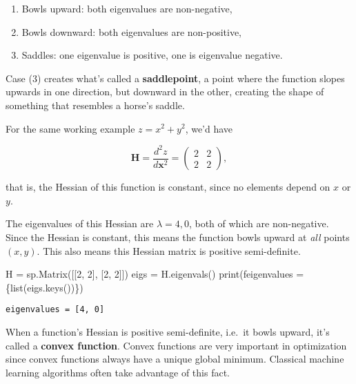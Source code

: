 \documentclass[
  letterpaper,
  DIV=11,
  numbers=noendperiod]{scrreprt}
\newenvironment{Shaded}{\begin{snugshade}}{\end{snugshade}}
\newcommand{\BuiltInTok}[1]{\textcolor[rgb]{0.00,0.23,0.31}{#1}}
\newcommand{\DecValTok}[1]{\textcolor[rgb]{0.68,0.00,0.00}{#1}}
\newcommand{\NormalTok}[1]{\textcolor[rgb]{0.00,0.23,0.31}{#1}}
\newcommand{\OperatorTok}[1]{\textcolor[rgb]{0.37,0.37,0.37}{#1}}
\newcommand{\SpecialCharTok}[1]{\textcolor[rgb]{0.37,0.37,0.37}{#1}}
\newcommand{\SpecialStringTok}[1]{\textcolor[rgb]{0.13,0.47,0.30}{#1}}
\providecommand{\tightlist}{%
  \setlength{\itemsep}{0pt}\setlength{\parskip}{0pt}}\usepackage{longtable,booktabs,array}
\begin{document}
\begin{enumerate}
\def\labelenumi{\arabic{enumi}.}
\tightlist
\item
  Bowls upward: both eigenvalues are non-negative,
\item
  Bowls downward: both eigenvalues are non-positive,
\item
  Saddles: one eigenvalue is positive, one is eigenvalue negative.
\end{enumerate}

Case (3) creates what's called a \textbf{saddlepoint}, a point where the
function slopes upwards in one direction, but downward in the other,
creating the shape of something that resembles a horse's saddle.

For the same working example \(z=x^2+y^2\), we'd have

\[
\mathbf{H} = \frac{d^2 z}{d\mathbf{x}^2} = 
\begin{pmatrix} 
2 & 2 \\
2 & 2
\end{pmatrix},
\]

that is, the Hessian of this function is constant, since no elements
depend on \(x\) or \(y\).

The eigenvalues of this Hessian are \(\lambda=4,0\), both of which are
non-negative. Since the Hessian is constant, this means the function
bowls upward at \emph{all} points \((x,y)\). This also means this
Hessian matrix is positive semi-definite.

\begin{Shaded}
\begin{Highlighting}[]
\NormalTok{H }\OperatorTok{=}\NormalTok{ sp.Matrix([[}\DecValTok{2}\NormalTok{, }\DecValTok{2}\NormalTok{], [}\DecValTok{2}\NormalTok{, }\DecValTok{2}\NormalTok{]])}
\NormalTok{eigs }\OperatorTok{=}\NormalTok{ H.eigenvals()}
\BuiltInTok{print}\NormalTok{(}\SpecialStringTok{f\textquotesingle{}eigenvalues = }\SpecialCharTok{\{}\BuiltInTok{list}\NormalTok{(eigs.keys())}\SpecialCharTok{\}}\SpecialStringTok{\textquotesingle{}}\NormalTok{)}
\end{Highlighting}
\end{Shaded}

\begin{verbatim}
eigenvalues = [4, 0]
\end{verbatim}

When a function's Hessian is positive semi-definite, i.e.~it bowls
upward, it's called a \textbf{convex function}. Convex functions are
very important in optimization since convex functions always have a
unique global minimum. Classical machine learning algorithms often take
advantage of this fact.
\end{document}
